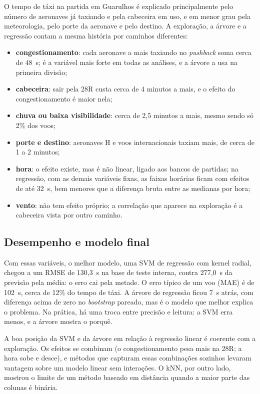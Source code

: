 \documentclass[12pt,a4paper]{article}
\begin{document}
O tempo de táxi na partida em Guarulhos é explicado principalmente pelo número de aeronaves já taxiando e pela cabeceira em uso, e em menor grau pela meteorologia, pelo porte da aeronave e pelo destino. A exploração, a árvore e a regressão contam a mesma história por caminhos diferentes:
\begin{itemize}
  \item \textbf{congestionamento}: cada aeronave a mais taxiando no \textit{pushback} soma cerca de 48~s; é a variável mais forte em todas as análises, e a árvore a usa na primeira divisão;
  \item \textbf{cabeceira}: sair pela 28R custa cerca de 4 minutos a mais, e o efeito do congestionamento é maior nela;
  \item \textbf{chuva ou baixa visibilidade}: cerca de 2,5 minutos a mais, mesmo sendo só 2\% dos voos;
  \item \textbf{porte e destino}: aeronaves H e voos internacionais taxiam mais, de cerca de 1 a 2 minutos;
  \item \textbf{hora}: o efeito existe, mas é não linear, ligado aos bancos de partidas; na regressão, com as demais variáveis fixas, as faixas horárias ficam com efeitos de até 32~s, bem menores que a diferença bruta entre as medianas por hora;
  \item \textbf{vento}: não tem efeito próprio; a correlação que aparece na exploração é a cabeceira vista por outro caminho.
\end{itemize}

\subsection{Desempenho e modelo final}

Com essas variáveis, o melhor modelo, uma SVM de regressão com kernel radial, chegou a um RMSE de 130,3~s na base de teste interna, contra 277,0~s da previsão pela média: o erro cai pela metade. O erro típico de um voo (MAE) é de 102~s, cerca de 12\% do tempo de táxi. A árvore de regressão ficou 7~s atrás, com diferença acima de zero no \textit{bootstrap} pareado, mas é o modelo que melhor explica o problema. Na prática, há uma troca entre precisão e leitura: a SVM erra menos, e a árvore mostra o porquê.

A boa posição da SVM e da árvore em relação à regressão linear é coerente com a exploração. Os efeitos se combinam (o congestionamento pesa mais na 28R; a hora sobe e desce), e métodos que capturam essas combinações sozinhos levaram vantagem sobre um modelo linear sem interações. O kNN, por outro lado, mostrou o limite de um método baseado em distância quando a maior parte das colunas é binária.
\end{document}

